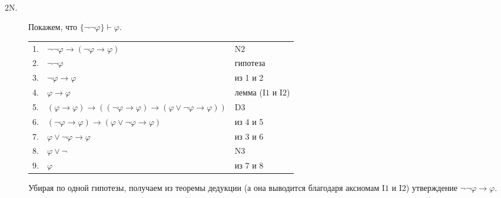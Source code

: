 \documentclass[12pt,a4paper]{article}
\begin{document}
    \begin{enumproblem}\ 
        \begin{description}
            \item[\underline{$\mathrm{2N}$}.] Покажем, что $\{\neg \neg \varphi\} \vdash \varphi$.
                \begin{center}
                    \begin{tabular}{rll}
                        1.& $\neg \neg \varphi \rightarrow (\neg \varphi \rightarrow \varphi)$& $\mathrm{N2}$\\
                        2.& $\neg \neg \varphi$& гипотеза\\
                        3.& $\neg \varphi \rightarrow \varphi$& из 1 и 2\\
                        4.& $\varphi \rightarrow \varphi$& лемма ($\mathrm{I1}$ и $\mathrm{I2}$)\\
                        5.& $(\varphi \rightarrow \varphi) \rightarrow ((\neg \varphi \rightarrow \varphi) \rightarrow (\varphi \vee \neg \varphi \rightarrow \varphi))$& $\mathrm{D3}$\\
                        6.& $(\neg \varphi \rightarrow \varphi) \rightarrow (\varphi \vee \neg \varphi \rightarrow \varphi)$& из 4 и 5\\
                        7.& $\varphi \vee \neg \varphi \rightarrow \varphi$& из 3 и 6\\
                        8.& $\varphi \vee \neg$& $\mathrm{N3}$\\
                        9.& $\varphi$& из 7 и 8\\
                    \end{tabular}
                \end{center}
                Убирая по одной гипотезы, получаем из теоремы дедукции (а она выводится благодаря аксиомам $\mathrm{I1}$ и $\mathrm{I2}$) утверждение $\neg \neg \varphi \rightarrow \varphi$.


\end{description}
\end{enumproblem}
\end{document}
